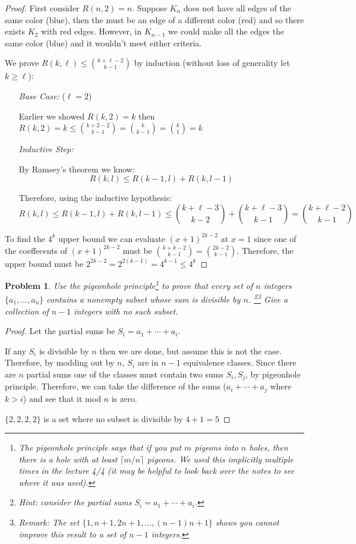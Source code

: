 \documentclass[11pt]{article}
\newtheorem{problem}{Problem}
\begin{document}
\begin{proof} 
First consider \(R(n, 2) = n\). Suppose \(K_n\) does not have all edges of the same color (blue), then the must be an edge of a different color (red) and so there exists \(K_2\) with red edges. However, in \(K_{n-1}\) we could make all the edges the same color (blue) and it wouldn't meet either criteria.

We prove $R(k,\ell)\le{k+\ell-2\choose k-1}$ by induction (without loss of generality let \(k \geq \ell\)):
\begin{enumerate}[align=left]
	\item[\emph{Base Case:}] (\(\ell = 2\))

	Earlier we showed \(R(k, 2) = k\) then \(R(k, 2) = k \leq {k+2-2\choose k-1} = {k\choose k-1} = {k \choose 1} = k\) 
	\item[\emph{Inductive Step:}]  

	By Ramsey's theorem we know:
	\[
		R(k, l) \leq R(k - 1, l) + R(k, l - 1)
	\]

	Therefore, using the inductive hypothesis:
	\[
		R(k, l) \leq R(k - 1, l) + R(k, l - 1) \leq {k+\ell-3\choose k-2} + {k+\ell-3\choose k-1} = {k+\ell-2\choose k-1} 
	\]
\end{enumerate}  

To find the \(4^k\) upper bound we can evaluate \((x+1)^{2k-2}\) at \(x = 1\) since one of the coeffecents of \((x+1)^{2k-2}\) must be \({k+k-2\choose k-1} = {2k-2\choose k-1}\). Therefore, the upper bound must be \(2^{2k-2} = 2^{2(k-1)} = 4^{k-1} \leq 4^k\)

\end{proof}

\pagebreak


\begin{problem}
Use the pigeonhole principle\footnote{The pigeonhole principle says that if you put $m$ pigeons into $n$ holes, then there is a hole with at least $\lceil m/n\rceil$ pigeons. We used this implicitly multiple times in the lecture 4/4 (it may be helpful to look back over the notes to see where it was used). } to prove that every set of $n$ integers $\{a_1,\ldots,a_n\}$ contains a nonempty subset whose sum is divisible by $n$. \footnote{Hint: consider the partial sums $S_i=a_1+\cdots+a_i$.}\footnote{Remark: The set $\{1,n+1,2n+1,\ldots,(n-1)n+1\}$ shows you cannot improve this result to a set of $n-1$ integers.} Give a collection of $n-1$ integers with no such subset. 
\end{problem}

\begin{proof}
Let the partial sums be $S_i=a_1+\cdots+a_i$.

If any \(S_i\) is divisible by \(n\) then we are done, but assume this is not the case. Therefore, by modding out by \(n\), \(S_i\) are in \(n-1\) equivalence classes. Since there are \(n\)  partial sums one of the classes must contain two sums \(S_i, S_j\), by pigeonhole principle. Therefore, we can take the difference of the sums (\(a_i + \cdots + a_j\) where \(k > i\)) and see that it mod \(n\) is zero.

\(\{2,2,2,2\}\) is a set where no subset is divisible by \(4 + 1 = 5\) 
\end{proof}
\end{document}
